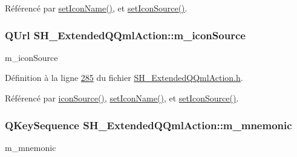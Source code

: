 Référencé par \hyperlink{classSH__ExtendedQQmlAction_a348526d65cd47b4ea6378e2a62065135}{set\-Icon\-Name()}, et \hyperlink{classSH__ExtendedQQmlAction_ae34fe314ba335d65d99932b27f1404f7}{set\-Icon\-Source()}.

\hypertarget{classSH__ExtendedQQmlAction_a61c8633eab1fa3b69752074220e785fc}{
\subsubsection[{m\-\_\-icon\-Source}]{\setlength{\rightskip}{0pt plus 5cm}Q\-Url S\-H\-\_\-\-Extended\-Q\-Qml\-Action\-::m\-\_\-icon\-Source\hspace{0.3cm}{\ttfamily [private]}}}\label{classSH__ExtendedQQmlAction_a61c8633eab1fa3b69752074220e785fc}


m\-\_\-icon\-Source 



Définition à la ligne \hyperlink{SH__ExtendedQQmlAction_8h_source_l00285}{285} du fichier \hyperlink{SH__ExtendedQQmlAction_8h_source}{S\-H\-\_\-\-Extended\-Q\-Qml\-Action.\-h}.



Référencé par \hyperlink{classSH__ExtendedQQmlAction_a4256635783087124d3df6fa9726e7d55}{icon\-Source()}, \hyperlink{classSH__ExtendedQQmlAction_a348526d65cd47b4ea6378e2a62065135}{set\-Icon\-Name()}, et \hyperlink{classSH__ExtendedQQmlAction_ae34fe314ba335d65d99932b27f1404f7}{set\-Icon\-Source()}.

\hypertarget{classSH__ExtendedQQmlAction_a7c924c07aa50a7228b6e8f31c4520896}{
\subsubsection[{m\-\_\-mnemonic}]{\setlength{\rightskip}{0pt plus 5cm}Q\-Key\-Sequence S\-H\-\_\-\-Extended\-Q\-Qml\-Action\-::m\-\_\-mnemonic\hspace{0.3cm}{\ttfamily [private]}}}\label{classSH__ExtendedQQmlAction_a7c924c07aa50a7228b6e8f31c4520896}


m\-\_\-mnemonic 



